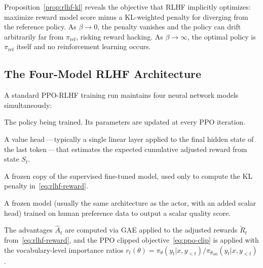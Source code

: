 Proposition~\ref{prop:rlhf-kl} reveals the objective that RLHF implicitly
optimizes: maximize reward model score minus a KL-weighted penalty for
diverging from the reference policy.  As $\beta \to 0$, the penalty
vanishes and the policy can drift arbitrarily far from $\pi_{\mathrm{ref}}$,
risking reward hacking.  As $\beta \to \infty$, the optimal policy is
$\pi_{\mathrm{ref}}$ itself and no reinforcement learning occurs.

\subsection{The Four-Model RLHF Architecture}

A standard PPO-RLHF training run maintains four neural network models
simultaneously:

\begin{description}[leftmargin=!, labelwidth=3.5cm]
  \item[Actor $\pi_\theta$] The policy being trained.  Its parameters are
    updated at every PPO iteration.
  \item[Critic $V_\phi$] A value head\,---\,typically a single linear layer
    applied to the final hidden state of the last token\,---\,that
    estimates the expected cumulative adjusted reward from state $S_t$.
  \item[Reference model $\pi_{\mathrm{ref}}$] A frozen copy of the
    supervised fine-tuned model, used only to compute the KL penalty
    in~\eqref{eq:rlhf-reward}.
  \item[Reward model $r_\psi$] A frozen model (usually the same
    architecture as the actor, with an added scalar head) trained on
    human preference data to output a scalar quality score.
\end{description}

The advantages $\hat{A}_t$ are computed via GAE applied to the adjusted
rewards $\tilde{R}_t$ from~\eqref{eq:rlhf-reward}, and the PPO clipped
objective~\eqref{eq:ppo-clip} is applied with the vocabulary-level
importance ratios $r_t(\theta) = \pi_\theta(y_t|x,y_{<t}) /
\pi_{\theta_\mathrm{old}}(y_t|x,y_{<t})$.

